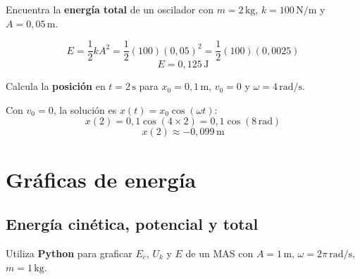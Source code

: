 \documentclass[12pt, a4paper, oneside]{book}
\newcommand{\Nm}{\,\text{N/m}}
\newcommand{\rad}{\,\text{rad/s}}
\newcommand{\kg}{\,\text{kg}}
\newcommand{\mts}{\,\text{m}}
\begin{document}
\begin{problema}[title={Problema~9}]
Encuentra la \textbf{energ\'ia total} de un oscilador con $m = 2\kg$,
$k = 100\Nm$ y $A = 0{,}05\mts$.
\end{problema}

\begin{solucion}
\[
  E = \dfrac{1}{2}kA^{2} = \dfrac{1}{2}(100)(0{,}05)^{2} = \dfrac{1}{2}(100)(0{,}0025)
\]
\[
  \boxed{E = 0{,}125\,\text{J}}
\]
\end{solucion}

\begin{problema}[title={Problema~10}]
Calcula la \textbf{posici\'on} en $t = 2\,\text{s}$ para $x_{0} = 0{,}1\mts$,
$v_{0} = 0$ y $\omega = 4\rad$.
\end{problema}

\begin{solucion}
Con $v_{0} = 0$, la soluci\'on es $x(t) = x_{0}\cos(\omega t)$:
\[
  x(2) = 0{,}1\cos(4 \times 2) = 0{,}1\cos(8\,\text{rad})
\]
\[
  \boxed{x(2) \approx -0{,}099\,\text{m}}
\]
\end{solucion}

\chapter{Gr\'aficas de energ\'ia}

\section{Energ\'ia cin\'etica, potencial y total}

\begin{problema}[title={Problema~11}]
Utiliza \textbf{Python} para graficar $E_c$, $U_k$ y $E$ de un MAS con
$A = 1\mts$, $\omega = 2\pi\rad$, $m = 1\kg$.
\end{problema}
\end{document}

